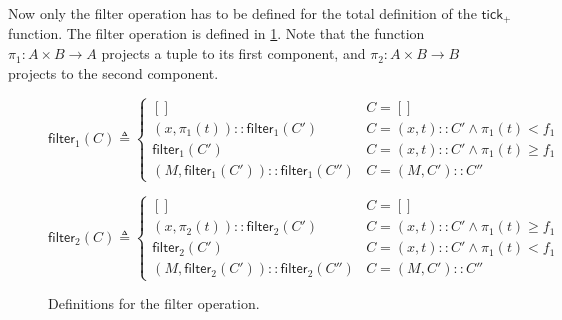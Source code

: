 \documentclass[acmsmall,review]{acmart}\settopmatter{printfolios=true,printccs=false,printacmref=false}
\theoremstyle{definition}
\newcommand*{\cons}{::}
\newcommand*{\tick}{\mathsf{tick}}
\newcommand*{\filter}{\mathsf{filter}}
\begin{document}
Now only the filter operation has to be defined for the total definition of the $\tick_+$ function.
The filter operation is defined in \ref{fig:concfilter}.
Note that the function $\pi_1:A\times B\rightarrow A$ projects a tuple to its first component, and $\pi_2:A\times B\rightarrow B$ projects to the second component.
\begin{figure}[h!]
  \footnotesize
  \[
    \filter_1(C)\triangleq
    \begin{cases}
      []                                   & C=[]                                  \\
      (x,\pi_1(t))\cons\filter_1(C')       & C=(x,t)\cons C'\wedge \pi_1(t)<f_1    \\
      \filter_1(C')                        & C=(x,t)\cons C'\wedge \pi_1(t)\ge f_1 \\
      (M,\filter_1(C'))\cons\filter_1(C'') & C=(M, C')\cons C''
    \end{cases}
  \]

  \[
    \filter_2(C)\triangleq
    \begin{cases}
      []                                   & C=[]                                  \\
      (x,\pi_2(t))\cons\filter_2(C')       & C=(x,t)\cons C'\wedge \pi_1(t)\ge f_1 \\
      \filter_2(C')                        & C=(x,t)\cons C'\wedge \pi_1(t)< f_1   \\
      (M,\filter_2(C'))\cons\filter_2(C'') & C=(M, C')\cons C''
    \end{cases}
  \]
  \caption{Definitions for the filter operation.}
  \label{fig:concfilter}
\end{figure}
\end{document}
